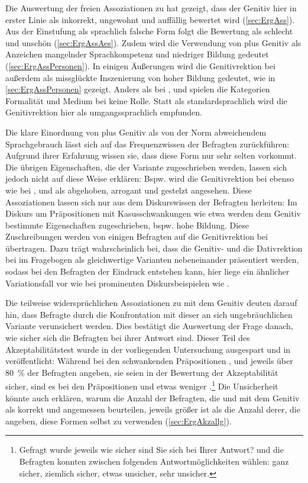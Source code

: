 Die Auswertung der freien Assoziationen zu \gegenueber{} hat gezeigt, dass der Genitiv hier in erster Linie als inkorrekt, ungewohnt und auffällig bewertet wird (\autoref{sec:ErgAss}). 
Aus der Einstufung als sprachlich falsche Form folgt die Bewertung als schlecht und unschön (\autoref{sec:ErgAssAes}). 
Zudem wird die Verwendung von \gegenueber{} plus Genitiv als Anzeichen mangelnder Sprachkompetenz und niedriger Bildung gedeutet (\autoref{sec:ErgAssPersonen}). 
In einigen Äußerungen wird die Genitivrektion bei \gegenueber{} außerdem als missglückte Inszenierung von hoher Bildung gedeutet, wie in \autoref{sec:ErgAssPersonen} gezeigt. 
Anders als bei \wegen, \waehrend{} und \dank{} spielen die Kategorien Formalität und Medium bei \gegenueber{} keine Rolle. 
Statt als standardsprachlich wird die Genitivrektion hier als umgangssprachlich empfunden. 

Die klare Einordnung von \gegenueber{} plus Genitiv als von der Norm abweichendem Sprachgebrauch lässt sich auf das Frequenzwissen der Befragten zurückführen: 
Aufgrund ihrer Erfahrung wissen sie, dass diese Form nur sehr selten vorkommt. 
Die übrigen Eigenschaften, die der Variante zugeschrieben werden, lassen sich jedoch nicht auf diese Weise erklären: 
Bspw. wird die Genitivrektion bei \gegenueber{} ebenso wie bei \wegen, \waehrend{} und \dank{} als abgehoben, arrogant und gestelzt angesehen. 
Diese Assoziationen lassen sich nur aus dem Diskurswissen der Befragten herleiten: 
Im Diskurs um Präpositionen mit Kasusschwankungen wie etwa \wegen{} werden dem Genitiv bestimmte Eigenschaften zugeschrieben, bspw. hohe Bildung.
Diese Zuschreibungen werden von einigen Befragten auf die Genitivrektion bei \gegenueber{} übertragen. 
Dazu trägt wahrscheinlich bei, dass die Genitiv- und die Dativrektion bei \gegenueber{} im Fragebogen als gleichwertige Varianten nebeneinander präsentiert werden, sodass bei den Befragten der Eindruck entstehen kann, hier liege ein ähnlicher Variationsfall vor wie bei prominenten Diskursbeispielen wie \wegen. 

Die teilweise widersprüchlichen Assoziationen zu \gegenueber{} mit dem Genitiv deuten darauf hin, dass Befragte durch die Konfrontation mit dieser an sich ungebräuchlichen Variante verunsichert werden. 
Dies bestätigt die Auswertung der Frage danach, wie sicher sich die Befragten bei ihrer Antwort sind. 
Dieser Teil des Akzeptabilitätstest wurde in der vorliegenden Untersuchung ausgespart und in \citet[][]{Vieregge.2019b} veröffentlicht: 
Während bei den schwankenden Präpositionen \wegen, \waehrend{} und \dank{} jeweils über 80~\% der Befragten angeben, sie seien in der Bewertung der Akzeptabilität sicher, sind es bei den Präpositionen \gegenueber{} und  etwas weniger \citep[s.][88--90]{Vieregge.2019b}.\footnote{Gefragt wurde jeweils \glqq wie sicher sind Sie sich bei Ihrer Antwort?\grqq{} und die Befragten konnten zwischen folgenden Antwortmöglichkeiten wählen: ganz sicher, ziemlich sicher, etwas unsicher, sehr unsicher.} 
Die Unsicherheit könnte auch erklären, warum die Anzahl der Befragten, die \gegenueber{} und  mit dem Genitiv als korrekt und angemessen beurteilen, jeweils größer ist als die Anzahl derer, die angeben, diese Formen selbst zu verwenden (\autoref{sec:ErgAkzallg}). 

